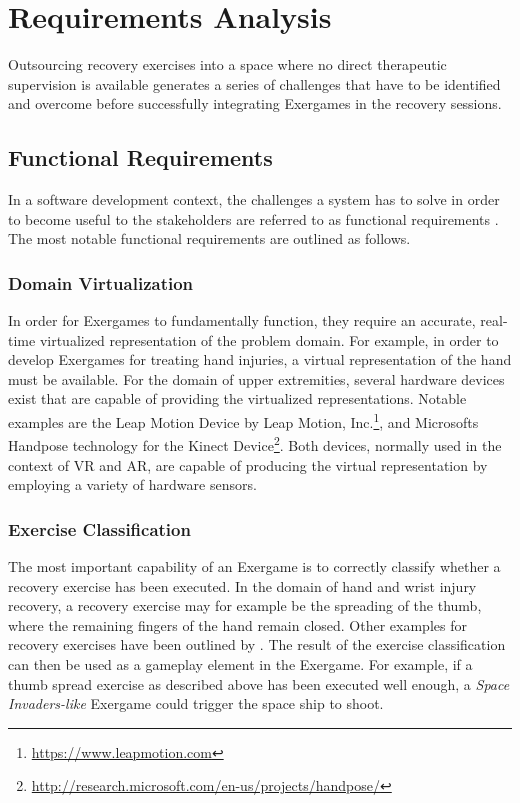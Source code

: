 \section{Requirements Analysis}
\label{sec:reqanalysis}
Outsourcing recovery exercises into a space where no direct therapeutic supervision is available generates a series of challenges that have to be identified and overcome before successfully integrating Exergames in the recovery sessions. 

\subsection{Functional Requirements}
\label{sec:frs}
In a software development context, the challenges a system has to solve in order to become useful to the stakeholders are referred to as functional requirements \cite{SystemRequirementsArmyFR}.  The most notable functional requirements are outlined as follows.

\subsubsection{Domain Virtualization}
\label{sec:freq:domain-virtualization}
In order for Exergames to fundamentally function, they require an accurate, real-time virtualized representation of the problem domain. For example, in order to develop Exergames for treating hand injuries, a virtual representation of the hand must be available. For the domain of upper extremities, several hardware devices exist that are capable of providing the virtualized representations. Notable examples are the Leap Motion Device by Leap Motion, Inc.\footnote{\url{https://www.leapmotion.com}}, and Microsofts Handpose technology for the Kinect Device\footnote{\url{http://research.microsoft.com/en-us/projects/handpose/}}. Both devices, normally used in the context of \gls{VR} and \gls{AR}, are capable of producing the virtual representation by employing a variety of hardware sensors.

\subsubsection{Exercise Classification}
\label{sec:exercise-classification}
The most important capability of an Exergame is to correctly classify whether a recovery exercise has been executed. In the domain of hand and wrist injury recovery, a recovery exercise may for example be the spreading of the thumb, where the remaining fingers of the hand remain closed. Other examples for recovery exercises have been outlined by \cite{StudiArbeitVolzBaumotte}. The result of the exercise classification can then be used as a gameplay element in the Exergame. For example, if a thumb spread exercise as described above has been executed well enough, a \emph{Space Invaders-like} Exergame could trigger the space ship to shoot.

